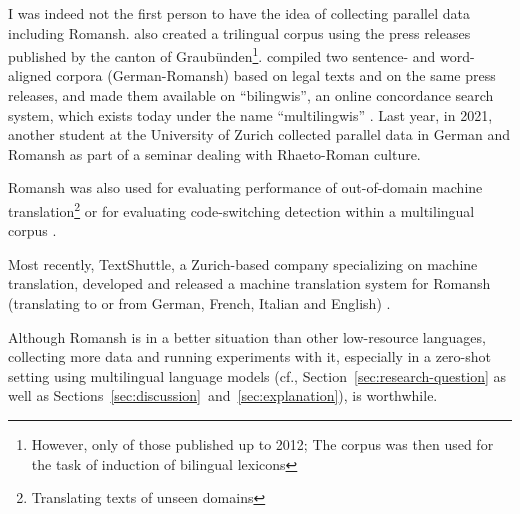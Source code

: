 I was indeed not the first person to have the idea of collecting parallel data including Romansh. 
\cite{scherrer-cartoni-2012-trilingual} also created a trilingual corpus using the press releases published by the canton of Graubünden\footnote{However, only of those published up to 2012; The corpus was then used for the task of induction of bilingual lexicons}. 
\cite{weibel-2014} compiled two sentence- and word-aligned corpora (German-Romansh) based on legal texts and on the same press releases, and made them available on \enquote{bilingwis}, an online concordance search system, which exists today under the name \enquote{multilingwis} \autocite{multilingwis}. 
Last year, in 2021, another student at the University of Zurich collected parallel data in German and Romansh as part of a seminar dealing with Rhaeto-Roman culture.

Romansh was also used for evaluating performance of out-of-domain machine translation\footnote{Translating texts of unseen domains} \autocite{muller-etal-2020-domain} or for evaluating code-switching detection within a multilingual corpus \autocite{volk-clematide-2014-detecting}.

Most recently, TextShuttle, a Zurich-based company specializing on machine translation, developed and released a machine translation system for Romansh (translating to or from German, French, Italian and English) \autocite{textshuttle}.

Although Romansh is in a better situation than other low-resource languages, collecting more data and running experiments with it, especially in a zero-shot setting using multilingual language models (cf., Section~\ref{sec:research-question} as well as Sections~\ref{sec:discussion}~and~\ref{sec:explanation}), is worthwhile.

